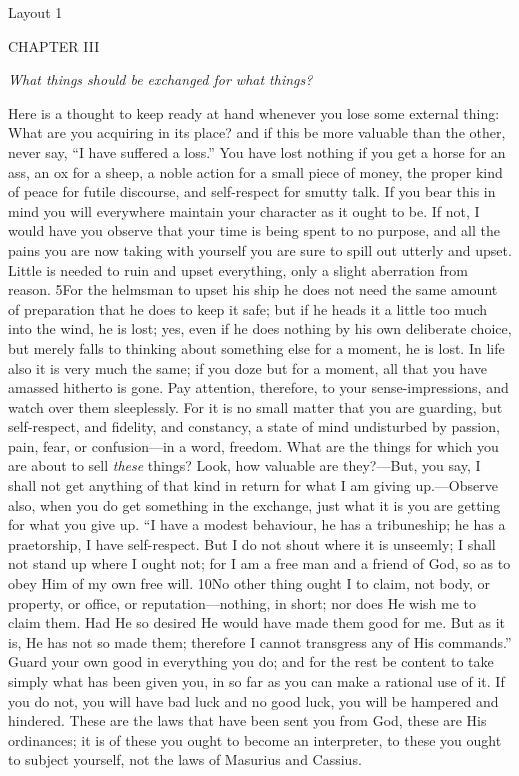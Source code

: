 
Layout 1

CHAPTER III

\emph{What things should be exchanged for what things?}

Here is a thought to keep ready at hand whenever you lose some external thing: What are you acquiring in its place? and if this be more valuable than the other, never say, ``I have suffered a loss.'' You have lost nothing if you get a horse for an ass, an ox for a sheep, a noble action for a small piece of money, the proper kind of peace for futile discourse, and self-respect for smutty talk. If you bear this in mind you will everywhere maintain your character as it ought to be. If not, I would have you observe that your time is being spent to no purpose, and all the pains you are now taking with yourself you are sure to spill out utterly and upset. Little is needed to ruin and upset everything, only a slight aberration from reason. 5For the helmsman to upset his ship he does not need the same amount of preparation that he does to keep it safe; but if he heads it a little too much into the wind, he is lost; yes, even if he does nothing by his own deliberate choice, but merely falls to thinking about something else for a moment, he is lost. In life also it is very much the same; if you doze but for a moment, all that you have amassed hitherto is gone. Pay attention, therefore, to your sense-impressions, and watch over them sleeplessly. For it is no small matter that you are guarding, but self-respect, and fidelity, and constancy, a state of mind undisturbed by passion, pain, fear, or confusion—in a word, freedom. What are the things for which you are about to sell \emph{these} things? Look, how valuable are they?—But, you say, I shall not get anything of that kind in return for what I am giving up.—Observe also, when you do get something in the exchange, just what it is you are getting for what you give up. ``I have a modest behaviour, he has a tribuneship; he has a praetorship, I have self-respect. But I do not shout where it is unseemly; I shall not stand up where I ought not; for I am a free man and a friend of God, so as to obey Him of my own free will. 10No other thing ought I to claim, not body, or property, or office, or reputation—nothing, in short; nor does He wish me to claim them. Had He so desired He would have made them good for me. But as it is, He has not so made them; therefore I cannot transgress any of His commands.'' Guard your own good in everything you do; and for the rest be content to take simply what has been given you, in so far as you can make a rational use of it. If you do not, you will have bad luck and no good luck, you will be hampered and hindered. These are the laws that have been sent you from God, these are His ordinances; it is of these you ought to become an interpreter, to these you ought to subject yourself, not the laws of Masurius and Cassius.

